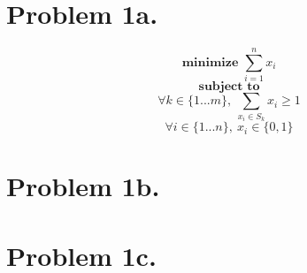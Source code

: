 \documentclass[12pt]{article}
\begin{document}
\pagestyle{plain}
\titleformat{\subsection}[runin]
  {\normalfont\large\bfseries}{\thesubsection}{1em}{}
\titleformat{\subsubsection}[runin]
  {\normalfont\large\bfseries}{\thesubsubsection}{1em}{}

\section*{Problem 1a.}
$$ \textbf{minimize } \sum_{i=1}^n x_i $$
$$ \textbf{ subject to } $$
$$ \forall k \in \{1...m\},\ \sum_{x_i \in S_k} x_i \ge 1 $$
$$ \forall i \in \{1...n\},\ x_i \in \{0,1\} $$

\section*{Problem 1b.}



\section*{Problem 1c.}
\end{document}
